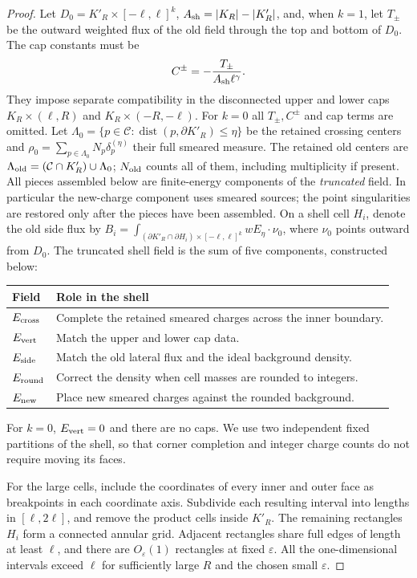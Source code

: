 \begin{proof}
Let $D_0=K'_R\times[-\ell,\ell]^k$, $A_{\rm sh}=|K_R|-|K'_R|$, and,
when $k=1$,
let $T_\pm$ be the outward weighted flux of the old field through the
top and bottom of $D_0$.  The cap constants must be
\begin{equation}
 C^\pm=-\frac{T_\pm}{A_{\rm sh}\ell^\gamma}.
 \label{eq:normalized-two-caps}
\end{equation}
They impose separate compatibility in the disconnected upper and
lower caps $K_R\times(\ell,R)$ and $K_R\times(-R,-\ell)$.
For $k=0$ all $T_\pm,C^\pm$ and cap terms are omitted.
Let $\Lambda_0=\{p\in\mathcal C:\operatorname{dist}(p,\partial K'_R)\le\eta\}$
be the retained crossing centers and
$\rho_0=\sum_{p\in\Lambda_0}N_p\delta_p^{(\eta)}$ their full
smeared measure.  The retained old centers are
$\Lambda_{\rm old}=(\mathcal C\cap K'_R)\cup\Lambda_0$;
$N_{\rm old}$ counts all of them, including multiplicity if present.
All pieces assembled below are finite-energy components of the
\emph{truncated} field.  In particular the new-charge component uses
smeared sources; the point singularities are restored only after the
pieces have been assembled.
On a shell cell $H_i$, denote the old side flux by
$B_i=\int_{(\partial K'_R\cap\partial H_i)\times[-\ell,\ell]^k}wE_\eta\cdot\nu_0$,
where $\nu_0$ points outward from $D_0$.
The truncated shell field is the sum of five components, constructed below:
\begin{center}
\begin{tabular}{@{}ll@{}}
\toprule
Field & Role in the shell\\
\midrule
$E_{\rm cross}$ & Complete the retained smeared charges across the inner boundary.\\
$E_{\rm vert}$ & Match the upper and lower cap data.\\
$E_{\rm side}$ & Match the old lateral flux and the ideal background density.\\
$E_{\rm round}$ & Correct the density when cell masses are rounded to integers.\\
$E_{\rm new}$ & Place new smeared charges against the rounded background.\\
\bottomrule
\end{tabular}
\end{center}
For $k=0$, $E_{\rm vert}=0$ and there are no caps.
We use two independent fixed partitions of the shell, so that corner
completion and integer charge counts do not require moving its faces.

For the large cells, include the coordinates of every inner and outer
face as breakpoints in each coordinate axis.  Subdivide each resulting
interval into lengths in $[\ell,2\ell]$, and remove the product cells
inside $K'_R$.  The remaining rectangles $H_i$ form a connected annular
grid.  Adjacent rectangles share full edges of length at least $\ell$,
and there are $O_\varepsilon(1)$ rectangles at fixed $\varepsilon$.
All the one-dimensional intervals exceed $\ell$ for sufficiently large
$R$ and the chosen small $\varepsilon$.


\end{proof}
